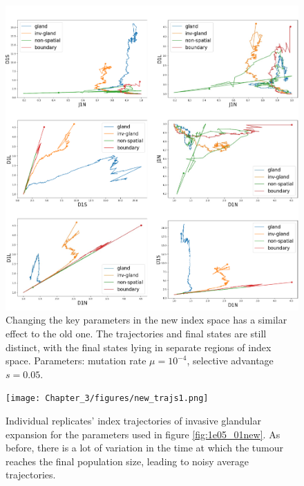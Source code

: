 \begin{figure}[h!]
    \centering
    \includegraphics[width=\textwidth]{Chapter_3/figures/1e04005new.pdf}
    \caption{Changing the key parameters in the new index space has a similar
    effect to the old one. The trajectories and final states are still
    distinct, with the final states lying in separate regions of index space.
    Parameters: mutation rate $\mu = 10^{-4}$, selective advantage $s = 0.05$.}
    \label{fig:1e04_005new}
\end{figure}

\begin{figure}[h!]
    \centering
    \texttt{[image: Chapter\_3/figures/new\_trajs1.png]}
    \caption{Individual replicates' index trajectories of invasive glandular
    expansion for the parameters used in figure \ref{fig:1e05_01new}. As
    before, there is a lot of variation in the time at which the tumour reaches
    the final population size, leading to noisy average trajectories.}
    \label{fig:new_trajs1}
\end{figure}

\clearpage

